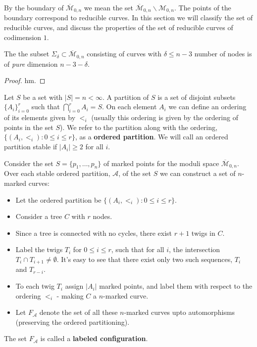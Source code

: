 By the boundary of $\overline{\mathcal{M}}_{0,n}$ we mean the set $\overline{\mathcal{M}}_{0,n} \backslash \mathcal{M}_{0,n}$.
The points of the boundary correspond to reducible curves.
In this section we will classify the set of reducible curves, and discuss the properties of the set of reducible curves of codimension $1$.

\begin{proposition}
    The the subset $\Sigma_{\delta} \subset \overline{\mathcal{M}}_{0,n}$ consisting of curves with $\delta \leq n-3$ number of nodes is of \textit{pure} dimension $n-3-\delta$.
\end{proposition}
\begin{proof}
    hm.
\end{proof}

\begin{definition}
    Let $S$ be a set with $|S| = n < \infty$.
    A partition of $S$ is a set of disjoint subsets $\{A_{i}\}_{i=0}^{r}$ such that $\bigcap_{i=0}^{r}A_{i} = S$.
    On each element $A_{i}$ we can define an ordering of its elements given by $<_{i}$ (usually this ordering is given by the ordering of points in the set $S$).
    We refer to the partition along with the ordering, $\{(A_{i},<_{i}): 0 \leq i\leq r\}$, as a \textbf{ordered partition}.
    We will call an ordered partition stable if $|A_{i}|\geq 2$ for all $i$.
\end{definition}

\begin{definition}
    \label{lblCnf}
    Consider the set $S = \{p_{1}, \dots, p_{n}\}$ of marked points for the moduli space $\overline{\mathcal{M}}_{0,n}$. 
    Over each stable ordered partition, $\mathcal{A}$, of the set $S$ we can construct a set of $n$-marked curves:
    \begin{itemize}
        \item Let the ordered partition be $\{(A_{i},<_{i}): 0 \leq i\leq r\}$.
        \item Consider a tree $C$ with $r$ nodes.
        \item Since a tree is connected with no cycles, there exist $r+1$ twigs in $C$.
        \item Label the twigs $T_{i}$ for $0\leq i \leq r$, such that for all $i$, the intersection $T_{i}\cap T_{i+1} \neq \emptyset$. 
            It's easy to see that there exist only two such sequences, $T_{i}$ and $T_{r-i}$.
        \item To each twig $T_{i}$ assign $|A_{i}|$ marked points, and label them with respect to the ordering $<_{i}$ - making $C$ a $n$-marked curve.
        \item Let $F_{\mathcal{A}}$ denote the set of all these $n$-marked curves upto automorphisms (preserving the ordered partitioning).
    \end{itemize}
    The set $F_{\mathcal{A}}$ is called a \textbf{labeled configuration}.
\end{definition}

